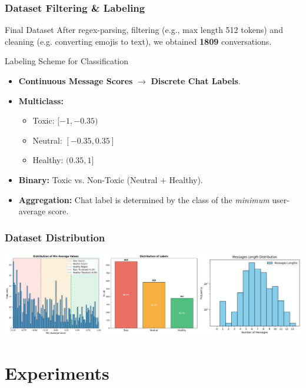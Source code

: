 \documentclass[aspectratio=169]{beamer}
\begin{document}
\begin{frame}
  \frametitle{Dataset Filtering \& Labeling}
  
  \begin{block}{Final Dataset}
    After regex-parsing, filtering (e.g., max length 512 tokens) and cleaning (e.g. converting emojis to text), we obtained \textbf{1809} conversations.
  \end{block}

  \begin{block}{Labeling Scheme for Classification}
      \begin{itemize}
          \item \textbf{Continuous Message Scores} $\rightarrow$ \textbf{Discrete Chat Labels}.
          \item \textbf{Multiclass:}
          \begin{itemize}
              \item Toxic: $[-1, -0.35)$
              \item Neutral: $[-0.35, 0.35]$
              \item Healthy: $(0.35, 1]$
          \end{itemize}
          \item \textbf{Binary:} Toxic vs. Non-Toxic (Neutral + Healthy).
          \item \textbf{Aggregation:} Chat label is determined by the class of the \textit{minimum} user-average score.
      \end{itemize}
  \end{block}
\end{frame}

\begin{frame}
  \frametitle{Dataset Distribution}
  \centering
  \includegraphics[width=\textwidth]{rsc/multiclass_distributions.png}
\end{frame}

\section{Experiments}
\end{document}
